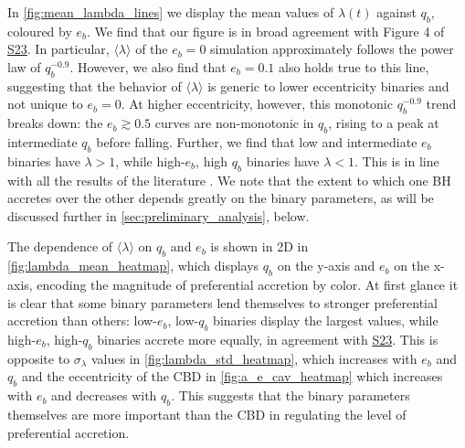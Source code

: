 \documentclass[fleqn,usenatbib]{mnras}
\newcommand{\Stwentythree}{\href{https://doi.org/10.1093/mnras/stac3263}{S23}\xspace}
\begin{document}
In \autoref{fig:mean_lambda_lines} we display the mean values of $\lambda(t)$ against $q_b$, coloured by $e_b$. We find that our figure is in broad agreement with Figure 4 of \Stwentythree. In particular, $\langle \lambda \rangle$ of the $e_b=0$ simulation approximately follows the power law of $q_b^{-0.9}$. However, we also find that $e_b=0.1$ also holds true to this line, suggesting that the behavior of $\langle \lambda \rangle $ is generic to lower eccentricity binaries and not unique to $e_b=0$. At higher eccentricity, however, this monotonic $q_b^{-0.9}$ trend breaks down: the $e_b \gtrsim 0.5$ curves are non-monotonic in $q_b$, rising to a peak at intermediate $q_b$ before falling. Further, we find that low and intermediate $e_b$ binaries have $\lambda >1$, while high-$e_b$, high $q_b$ binaries have $\lambda <1$. This is in line with all the results of the literature \citep{munoz_miranda_lai_19, duffell_dorazio_2020, farris_2014, Dittmann_Ryan_21, siwek_prefacc}. We note that the extent to which one BH accretes over the other depends greatly on the binary parameters, as will be discussed further in \autoref{sec:preliminary_analysis}, below.

The dependence of $\langle \lambda \rangle$ on $q_b$ and $e_b$ is shown in 2D in \autoref{fig:lambda_mean_heatmap}, which displays $q_b$ on the y-axis and $e_b$ on the x-axis, encoding the magnitude of preferential accretion by color. At first glance it is clear that some binary parameters lend themselves to stronger preferential accretion than others: low-$e_b$, low-$q_b$ binaries display the largest values, while high-$e_b$, high-$q_b$ binaries accrete more equally, in agreement with \Stwentythree. This is opposite to $\sigma_{\lambda}$ values in \autoref{fig:lambda_std_heatmap}, which increases with $e_b$ and $q_b$ and the eccentricity of the CBD in \autoref{fig:a_e_cav_heatmap} which increases with $e_b$ and decreases with $q_b$. This suggests that the binary parameters themselves are more important than the CBD in regulating the level of preferential accretion.
\end{document}
